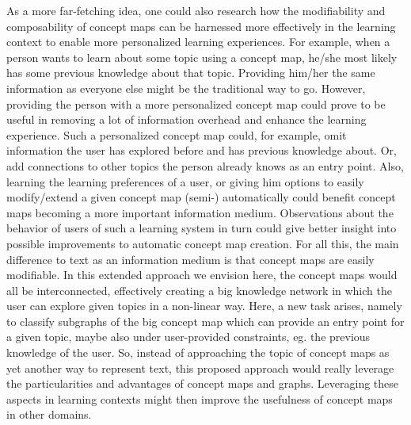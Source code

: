 As a more far-fetching idea, one could also research how the modifiability and composability of concept maps can be harnessed more effectively in the learning context to enable more personalized learning experiences.
For example, when a person wants to learn about some topic using a concept map, he/she most likely has some previous knowledge about that topic.
Providing him/her the same information as everyone else might be the traditional way to go. 
However, providing the person with a more personalized concept map could prove to be useful in removing a lot of information overhead and enhance the learning experience.
Such a personalized concept map could, for example, omit information the user has explored before and has previous knowledge about.
Or, add connections to other topics the person already knows as an entry point.
Also, learning the learning preferences of a user, or giving him options to easily modify/extend a given concept map (semi-) automatically could benefit concept maps becoming a more important information medium.
Observations about the behavior of users of such a learning system in turn could give better insight into possible improvements to automatic concept map creation.
For all this, the main difference to text as an information medium is that concept maps are easily modifiable.
In this extended approach we envision here, the concept maps would all be interconnected, effectively creating a big knowledge network in which the user can explore given topics in a non-linear way.
Here, a new task arises, namely to classify subgraphs of the big concept map which can provide an entry point for a given topic, maybe also under user-provided constraints, eg. the previous knowledge of the user.
So, instead of approaching the topic of concept maps as yet another way to represent text, this proposed approach would really leverage the particularities and advantages of concept maps and graphs.
Leveraging these aspects in learning contexts might then improve the usefulness of concept maps in other domains.



